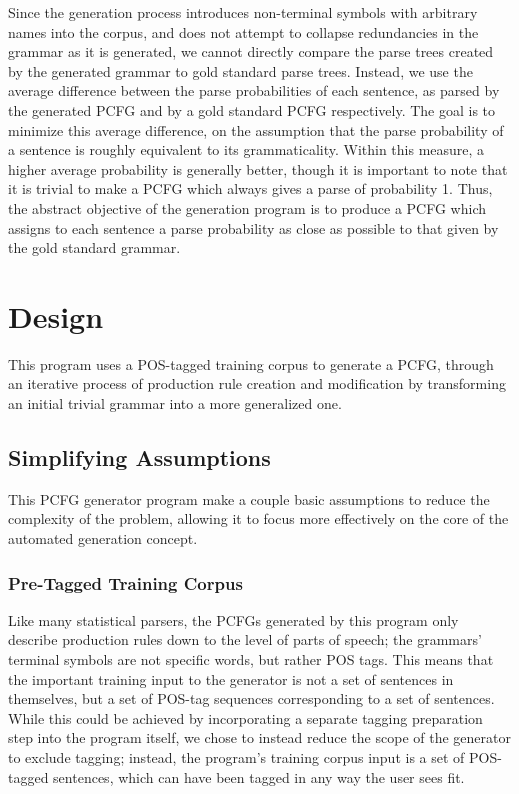 \documentclass[paper=a4, fontsize=11pt]{scrartcl} %
\numberwithin{equation}{section} %
\numberwithin{figure}{section} %
\numberwithin{table}{section} %
\begin{document}
Since the generation process introduces non-terminal symbols with arbitrary names into the corpus, and does not attempt to collapse redundancies in the grammar as it is generated, we cannot directly compare the parse trees created by the generated grammar to gold standard parse trees. Instead, we use the average difference between the parse probabilities of each sentence, as parsed by the generated PCFG and by a gold standard PCFG respectively. The goal is to minimize this average difference, on the assumption that the parse probability of a sentence is roughly equivalent to its grammaticality. Within this measure, a higher average probability is generally better, though it is important to note that it is trivial to make a PCFG which always gives a parse of probability 1. Thus, the abstract objective of the generation program is to produce a PCFG which assigns to each sentence a parse probability as close as possible to that given by the gold standard grammar.



\section{Design}

This program uses a POS-tagged training corpus to generate a PCFG, through an iterative process of production rule creation and modification by transforming an initial trivial grammar into a more generalized one.

\subsection{Simplifying Assumptions}

This PCFG generator program make a couple basic assumptions to reduce the complexity of the problem, allowing it to focus more effectively on the core of the automated generation concept.

\subsubsection{Pre-Tagged Training Corpus}

Like many statistical parsers, the PCFGs generated by this program only describe production rules down to the level of parts of speech; the grammars' terminal symbols are not specific words, but rather POS tags. This means that the important training input to the generator is not a set of sentences in themselves, but a set of POS-tag sequences corresponding to a set of sentences. While this could be achieved by incorporating a separate tagging preparation step into the program itself, we chose to instead reduce the scope of the generator to exclude tagging; instead, the program's training corpus input is a set of POS-tagged sentences, which can have been tagged in any way the user sees fit.
\end{document}
